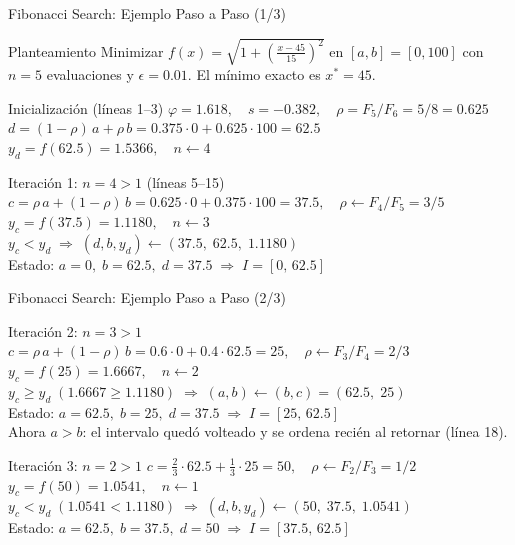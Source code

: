 \begin{frame}{Fibonacci Search: Ejemplo Paso a Paso (1/3)}
    \scriptsize
    \begin{exampleblock}{Planteamiento}
        Minimizar $f(x)=\sqrt{1+\left(\frac{x-45}{15}\right)^{2}}$ en $[a,b]=[0,100]$
        con $n=5$ evaluaciones y $\epsilon=0.01$. El mínimo exacto es $x^{*}=45$.
    \end{exampleblock}

    \begin{block}{Inicialización (líneas 1--3)}
        $\varphi=1.618,\quad s=-0.382,\quad \rho=F_5/F_6=5/8=0.625$\\[2pt]
        $d=(1-\rho)\,a+\rho\, b=0.375\cdot 0+0.625\cdot 100=62.5$\\[2pt]
        $y_d=f(62.5)=1.5366,\quad n\gets 4$
    \end{block}

    \begin{block}{Iteración 1: $n=4>1$ (líneas 5--15)}
        $c=\rho\, a+(1-\rho)\, b=0.625\cdot 0+0.375\cdot 100=37.5,\quad \rho\gets F_4/F_5=3/5$\\[2pt]
        $y_c=f(37.5)=1.1180,\quad n\gets 3$\\[2pt]
        $y_c<y_d \;\Rightarrow\; (d,b,y_d)\gets(37.5,\;62.5,\;1.1180)$\\[2pt]
        Estado: $a=0,\; b=62.5,\; d=37.5 \;\Rightarrow\; I=[0,\,62.5]$
    \end{block}
\end{frame}

\begin{frame}{Fibonacci Search: Ejemplo Paso a Paso (2/3)}
    \scriptsize
    \begin{block}{Iteración 2: $n=3>1$}
        $c=\rho\, a+(1-\rho)\, b=0.6\cdot 0+0.4\cdot 62.5=25,\quad \rho\gets F_3/F_4=2/3$\\[2pt]
        $y_c=f(25)=1.6667,\quad n\gets 2$\\[2pt]
        $y_c\ge y_d\;(1.6667\ge 1.1180) \;\Rightarrow\; (a,b)\gets(b,c)=(62.5,\;25)$\\[2pt]
        Estado: $a=62.5,\; b=25,\; d=37.5 \;\Rightarrow\; I=[25,\,62.5]$\\[2pt]
        {\tiny Ahora $a>b$: el intervalo quedó volteado y se ordena recién al retornar (línea 18).}
    \end{block}

    \begin{block}{Iteración 3: $n=2>1$}
        $c=\tfrac{2}{3}\cdot 62.5+\tfrac{1}{3}\cdot 25=50,\quad \rho\gets F_2/F_3=1/2$\\[2pt]
        $y_c=f(50)=1.0541,\quad n\gets 1$\\[2pt]
        $y_c<y_d\;(1.0541< 1.1180) \;\Rightarrow\; (d,b,y_d)\gets(50,\;37.5,\;1.0541)$\\[2pt]
        Estado: $a=62.5,\; b=37.5,\; d=50 \;\Rightarrow\; I=[37.5,\,62.5]$
    \end{block}
\end{frame}

